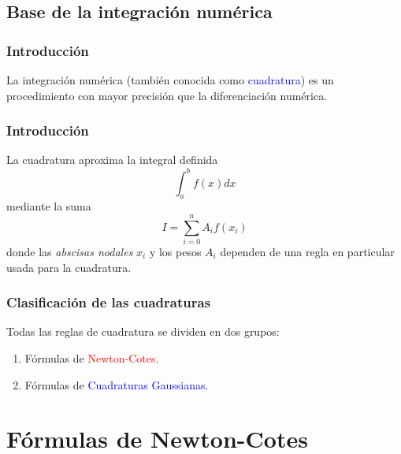 \subsection{Base de la integración numérica}
\begin{frame}
\frametitle{Introducción}
La integración numérica (también conocida como \textcolor{blue}{cuadratura}) es un procedimiento con mayor precisión que la diferenciación numérica.
\end{frame}
\begin{frame}
\frametitle{Introducción}
La cuadratura aproxima la integral definida
\[\int_{a}^{b} f(x) dx\]
mediante la suma
\[ I = \sum_{i=0}^{n} A_{i}f(x_{i})\]
\fontsize{12}{12}\selectfont
donde las \textit{abscisas nodales} $x_{i}$ y los pesos $A_{i}$ dependen de una regla en particular usada para la cuadratura.
\end{frame}
\begin{frame}
\frametitle{Clasificación de las cuadraturas}
Todas las reglas de cuadratura se dividen en dos grupos:
	\begin{enumerate}
		\item Fórmulas de \textcolor{red}{Newton-Cotes}.
		\item Fórmulas de \textcolor{blue}{Cuadraturas Gaussianas}.
	\end{enumerate}
\end{frame}
\section{Fórmulas de Newton-Cotes}
